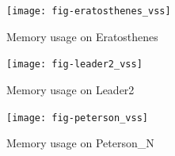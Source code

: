 \documentclass{acm_proc_article-sp}
\begin{document}
\begin{figure}[p]
\centering
\texttt{[image: fig-eratosthenes\_vss]}
\caption{Memory usage on Eratosthenes}
\label{fig-eratosthenes_vss}
\end{figure}

\begin{figure}[p]
\centering
\texttt{[image: fig-leader2\_vss]}
\caption{Memory usage on Leader2}
\label{fig-leader2_vss}
\end{figure}

\begin{figure}[p]
\centering
\texttt{[image: fig-peterson\_vss]}
\caption{Memory usage on Peterson\_N}
\label{fig-peterson_vss}
\end{figure}
\end{document}

